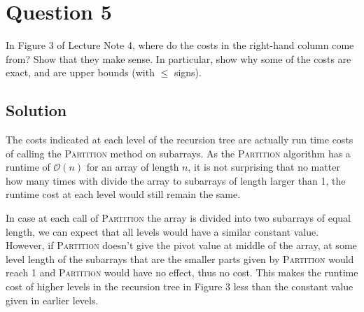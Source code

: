 
\section*{Question 5}

In Figure 3 of Lecture Note 4, where do the costs in the right-hand column come from? Show that they make sense. In particular, show why some of the costs are exact, and are upper bounds (with $\leq$ signs).

\subsection*{Solution}

The costs indicated at each level of the recursion tree are actually run time costs of calling the \textsc{Partition} method on subarrays. As the \textsc{Partition} algorithm has a runtime of $\mathcal{O}(n)$ for an array of length $n$, it is not surprising that no matter how many times with divide the array to subarrays of length larger than 1, the runtime cost at each level would still remain the same.

In case at each call of \textsc{Partition} the array is divided into two subarrays of equal length, we can expect that all levels would have a similar constant value. However, if \textsc{Partition} doesn't give the pivot value at middle of the array, at some level length of the subarrays that are the smaller parts given by \textsc{Partition} would reach 1 and \textsc{Partition} would have no effect, thus no cost. This makes the runtime cost of higher levels in the recursion tree in Figure 3 less than the constant value given in earlier levels.
